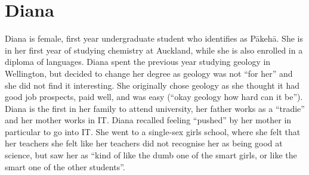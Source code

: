\section{Diana}
Diana is female, first year undergraduate student who identifies as P\={a}keh\={a}. She is in her first year of studying chemistry at Auckland, while she is also enrolled in a diploma of languages. Diana spent the previous year studying geology in Wellington, but decided to change her degree as geology was not ``for her'' and she did not find it interesting. She originally chose geology as she thought it had good job prospects, paid well, and was easy (``okay geology how hard can it be''). Diana is the first in her family to attend university, her father works as a ``tradie'' and her mother works in IT. Diana recalled feeling ``pushed'' by her mother in particular to go into IT. She went to a single-sex girls school, where she felt that her teachers she felt like her teachers did not recognise her as being good at science, but saw her as ``kind of like the dumb one of the smart girls, or like the smart one of the other students''. 





